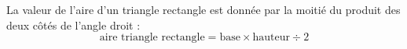 La valeur de l'aire d'un triangle rectangle est donnée par la moitié du produit
des deux côtés de l'angle droit :
$$\text{aire triangle rectangle}=\text{base}\times\text{hauteur}\div 2$$
